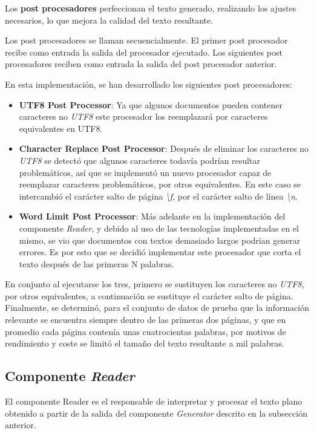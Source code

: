 Los \textbf{post procesadores} perfeccionan el texto generado, realizando los ajustes necesarios, lo que mejora la
calidad del texto resultante.

Los post procesadores se llaman secuencialmente.
El primer post procesador recibe como entrada la salida del procesador ejecutado.
Los siguientes post procesadores reciben como entrada la salida del post procesador anterior.

En esta implementación, se han desarrollado los siguientes post procesadores:

\begin{itemize}
    \item
    \textbf{UTF8 Post Processor}: Ya que algunos documentos pueden contener caracteres no \textit{UTF8} este procesador
    los reemplazará por caracteres equivalentes en UTF8.

    \item
    \textbf{Character Replace Post Processor}: Después de eliminar los caracteres no \textit{UTF8} se detectó que
    algunos caracteres todavía podrían resultar problemáticos, así que se implementó un nuevo procesador capaz de
    reemplazar caracteres problemáticos, por otros equivalentes.
    En este caso se intercambió el carácter salto de página \textit{\textbackslash f}, por el carácter
    salto de línea \textit{\textbackslash n}.

    \item
    \textbf{Word Limit Post Processor}: Más adelante en la implementación del componente \textit{Reader}, y debido
    al uso de las tecnologías implementadas en el mismo, se vio que documentos con textos demasiado largos podrían
    generar errores.
    Es por esto que se decidió implementar este procesador que corta el texto después de las primeras N palabras.
\end{itemize}

En conjunto al ejecutarse los tres, primero se sustituyen los caracteres no \textit{UTF8}, por otros equivalentes, a
continuación se sustituye el carácter salto de página.
Finalmente, se determinó, para el conjunto de datos de prueba que la información relevante se encuentra siempre
dentro de las primeras dos páginas, y que en promedio cada página contenía unas cuatrocientas palabras, por motivos de
rendimiento y coste se limitó el tamaño del texto resultante a mil palabras.

\subsection*{Componente \textit{Reader}}\label{subsec:chapter_4.reader_component}
El componente Reader es el responsable de interpretar y procesar el texto plano obtenido a partir de la salida del
componente \textit{Generator} descrito en la subsección anterior.

